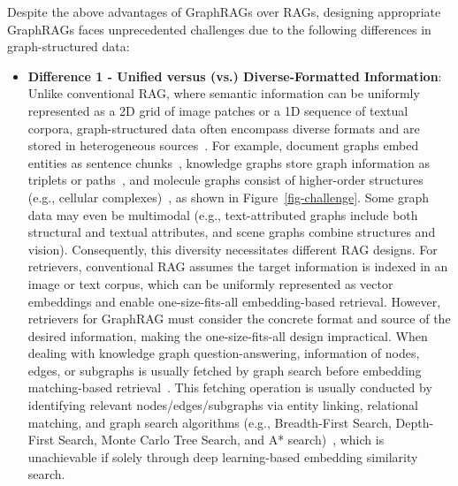 Despite the above advantages of GraphRAGs over RAGs, designing appropriate GraphRAGs faces unprecedented challenges due to the following differences in graph-structured data:



\vspace{-1ex}
\begin{itemize}[leftmargin=*]
    \item \textbf{Difference 1 - Unified versus (vs.) Diverse-Formatted Information}: Unlike conventional RAG, where semantic information can be uniformly represented as a 2D grid of image patches or a 1D sequence of textual corpora, graph-structured data often encompass diverse formats and are stored in heterogeneous sources~\cite{aggarwal2017edge, bodnar2021weisfeiler, wang2022retrieval}. For example, document graphs embed entities as sentence chunks~\cite{edge2024local, wang2024knowledge}, knowledge graphs store graph information as triplets or paths~\cite{chang2024path}, and molecule graphs consist of higher-order structures (e.g., cellular complexes)~\cite{bodnar2021weisfeiler}, as shown in Figure~\ref{fig-challenge}. Some graph data may even be multimodal (e.g., text-attributed graphs include both structural and textual attributes, and scene graphs combine structures and vision). Consequently, this diversity necessitates different RAG designs. For retrievers, conventional RAG assumes the target information is indexed in an image or text corpus, which can be uniformly represented as vector embeddings and enable one-size-fits-all embedding-based retrieval. However, retrievers for GraphRAG must consider the concrete format and source of the desired information, making the one-size-fits-all design impractical. When dealing with knowledge graph question-answering, information of nodes, edges, or subgraphs is usually fetched by graph search before embedding matching-based retrieval~\cite{wang2023knowledge, yasunaga2021qa}. This fetching operation is usually conducted by identifying relevant nodes/edges/subgraphs via entity linking, relational matching, and graph search algorithms (e.g., Breadth-First Search, Depth-First Search, Monte Carlo Tree Search, and A* search)~\cite{tian2024graph, wang2023knowledge, zhuang2023toolchain}, which is unachievable if solely through deep learning-based embedding similarity search. 

\end{itemize}
